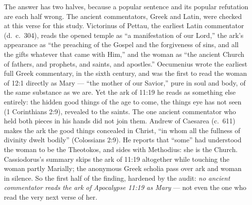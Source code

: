 The answer has two halves, because a popular sentence and its popular
refutation are each half wrong. The ancient commentators, Greek and
Latin, were checked at this verse for this study. Victorinus of Pettau,
the earliest Latin commentator (d.~c.~304), reads the opened temple as
``a manifestation of our Lord,'' the ark's appearance as ``the preaching
of the Gospel and the forgiveness of sins, and all the gifts whatever
that came with Him,'' and the woman as ``the ancient Church of fathers,
and prophets, and saints, and apostles.'' Oecumenius wrote the earliest
full Greek commentary, in the sixth century, and was the first to read
the woman of 12:1 directly as Mary --- ``the mother of our Savior,'' pure
in soul and body, of the same substance as we are. Yet the ark of 11:19
he reads as something else entirely: the hidden good things of the age to
come, the things eye has not seen (1 Corinthians 2:9), revealed to the
saints. The one ancient commentator who held both pieces in his hands did
not join them. Andrew of Caesarea (c.~611) makes the ark the good things
concealed in Christ, ``in whom all the fullness of divinity dwelt
bodily'' (Colossians 2:9). He reports that ``some'' had understood the
woman to be the Theotokos, and sides with Methodius: she is the Church.
Cassiodorus's summary skips the ark of 11:19 altogether while touching
the woman partly Marially; the anonymous Greek scholia pass over ark and
woman in silence. So the first half of the finding, hardened by the
audit: \emph{no ancient commentator reads the ark of Apocalypse 11:19 as
Mary} --- not even the one who read the very next verse of
her.

